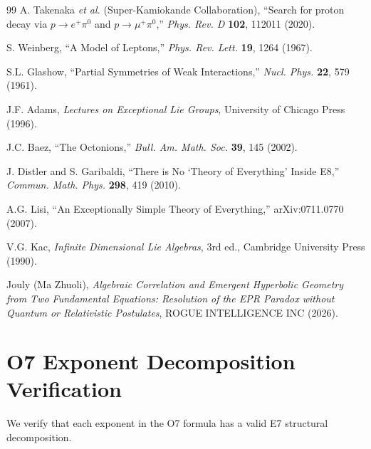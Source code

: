 \documentclass[11pt,a4paper]{article}
\begin{document}
\begin{thebibliography}{99}
A. Takenaka \textit{et al.} (Super-Kamiokande Collaboration),
``Search for proton decay via $p \to e^+\pi^0$ and $p \to \mu^+\pi^0$,''
\textit{Phys. Rev. D} \textbf{102}, 112011 (2020).

S. Weinberg,
``A Model of Leptons,''
\textit{Phys. Rev. Lett.} \textbf{19}, 1264 (1967).

S.L. Glashow,
``Partial Symmetries of Weak Interactions,''
\textit{Nucl. Phys.} \textbf{22}, 579 (1961).

J.F. Adams,
\textit{Lectures on Exceptional Lie Groups},
University of Chicago Press (1996).

J.C. Baez,
``The Octonions,''
\textit{Bull. Am. Math. Soc.} \textbf{39}, 145 (2002).

J. Distler and S. Garibaldi,
``There is No `Theory of Everything' Inside E8,''
\textit{Commun. Math. Phys.} \textbf{298}, 419 (2010).

A.G. Lisi,
``An Exceptionally Simple Theory of Everything,''
arXiv:0711.0770 (2007).

V.G. Kac,
\textit{Infinite Dimensional Lie Algebras},
3rd ed., Cambridge University Press (1990).

Jouly (Ma Zhuoli),
\textit{Algebraic Correlation and Emergent Hyperbolic Geometry from Two Fundamental Equations: Resolution of the EPR Paradox without Quantum or Relativistic Postulates},
ROGUE INTELLIGENCE INC (2026).

\end{thebibliography}

\appendix
\renewcommand{\thesection}{\AlphAlph{\value{section}}}
\section{O7 Exponent Decomposition Verification}

We verify that each exponent in the O7 formula has a valid E7 structural decomposition.
\end{document}
